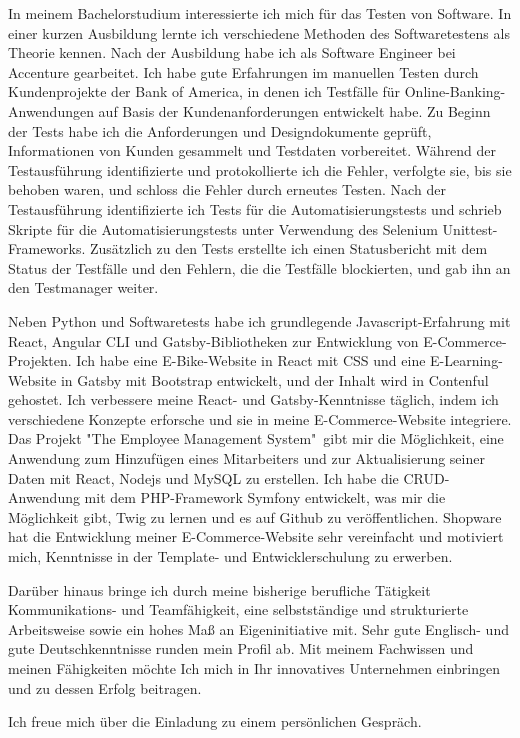 \documentclass[11.5pt,a4paper,sans]{moderncv}
\begin{document}
In meinem Bachelorstudium interessierte ich mich für das Testen von Software. In einer kurzen Ausbildung lernte ich verschiedene Methoden des Softwaretestens als Theorie kennen. Nach der Ausbildung habe ich als Software Engineer bei Accenture gearbeitet. Ich habe gute Erfahrungen im manuellen Testen durch Kundenprojekte der Bank of America, in denen ich Testfälle für Online-Banking-Anwendungen auf Basis der Kundenanforderungen entwickelt habe. Zu Beginn der Tests habe ich die Anforderungen und Designdokumente geprüft, Informationen von Kunden gesammelt und Testdaten vorbereitet. Während der Testausführung identifizierte und protokollierte ich die Fehler, verfolgte sie, bis sie behoben waren, und schloss die Fehler durch erneutes Testen. Nach der Testausführung identifizierte ich Tests für die Automatisierungstests und schrieb Skripte für die Automatisierungstests unter Verwendung des Selenium Unittest-Frameworks. Zusätzlich zu den Tests erstellte ich einen Statusbericht mit dem Status der Testfälle und den Fehlern, die die Testfälle blockierten, und gab ihn an den Testmanager weiter.

Neben Python und Softwaretests habe ich grundlegende Javascript-Erfahrung mit React, Angular CLI und Gatsby-Bibliotheken zur Entwicklung von E-Commerce-Projekten. Ich habe eine E-Bike-Website in React mit CSS und eine E-Learning-Website in Gatsby mit Bootstrap entwickelt, und der Inhalt wird in Contenful gehostet. Ich verbessere meine React- und Gatsby-Kenntnisse täglich, indem ich verschiedene Konzepte erforsche und sie in meine E-Commerce-Website integriere. Das Projekt "The Employee Management System"\ gibt mir die Möglichkeit, eine Anwendung zum Hinzufügen eines Mitarbeiters und zur Aktualisierung seiner Daten mit React, Nodejs und MySQL zu erstellen. Ich habe die CRUD-Anwendung mit dem PHP-Framework Symfony entwickelt, was mir die Möglichkeit gibt, Twig zu lernen und es auf Github zu veröffentlichen. Shopware hat die Entwicklung meiner E-Commerce-Website sehr vereinfacht und motiviert mich, Kenntnisse in der Template- und Entwicklerschulung zu erwerben. 

Darüber hinaus bringe ich durch meine bisherige berufliche Tätigkeit Kommunikations- und Teamfähigkeit, eine selbstständige und strukturierte Arbeitsweise sowie ein hohes Maß an Eigeninitiative mit. Sehr gute Englisch- und gute Deutschkenntnisse runden mein Profil ab. Mit meinem Fachwissen und meinen Fähigkeiten möchte Ich mich in Ihr innovatives Unternehmen einbringen und zu dessen Erfolg beitragen.

Ich freue mich über die Einladung zu einem persönlichen Gespräch.

\makeletterclosing
\vspace{0.5mm}
\end{document}

